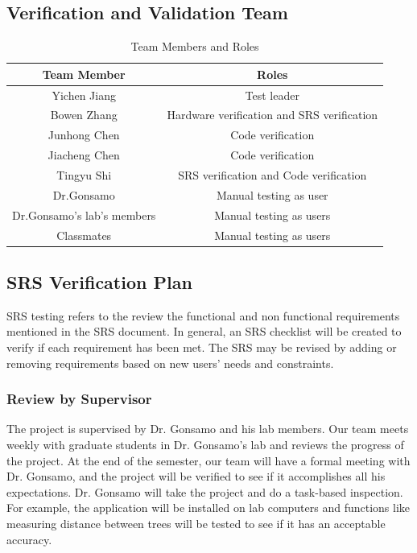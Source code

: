 \documentclass[12pt, titlepage]{article}
\begin{document}
\subsection{Verification and Validation Team}
\begin{table}[H]
    \centering
    \begin{tabular}{|c|c|}
    \hline
         Team Member  & Roles\\
         \hline
         Yichen Jiang & Test leader\\
         \hline
         Bowen Zhang  & Hardware verification and SRS verification\\
         \hline
         Junhong Chen & Code verification\\
         \hline
         Jiacheng Chen & Code verification\\
         \hline
         Tingyu Shi & SRS verification and Code verification\\
         \hline
         Dr.Gonsamo & Manual testing as user\\
         \hline
         Dr.Gonsamo's lab's members  & Manual testing as users\\
         \hline
         Classmates & Manual testing as users\\
         \hline
    \end{tabular}
    \caption{Team Members and Roles}
\end{table}

\subsection{SRS Verification Plan}
SRS testing refers to the review the functional and non functional requirements mentioned
in the SRS document. In general, an SRS checklist will be created to verify if each
requirement has been met. The SRS may be revised by adding or removing requirements
based on new users' needs and constraints.

\subsubsection{Review by Supervisor}
The project is supervised by Dr. Gonsamo and his lab members. Our team meets weekly
with graduate students in Dr. Gonsamo's lab and reviews the progress of the project.
At the end of the semester, our team will have a formal meeting with Dr. Gonsamo, and
the project will be verified to see if it accomplishes all his expectations. 
Dr. Gonsamo will take the project and do a task-based inspection. For example, the application will be installed on lab computers and functions like measuring distance
between trees will be tested to see if it has an acceptable accuracy.
\end{document}
